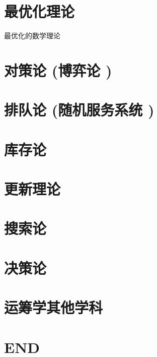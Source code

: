 \documentclass[UTF8]{../09-Mathematics}
\begin{document}
\chapter{最优化理论} %
最优化的数学理论

\chapter{对策论 (博弈论 )}
\chapter{排队论 (随机服务系统 )}

\chapter{库存论}
\chapter{更新理论}
\chapter{搜索论}



\chapter{决策论}
\chapter{运筹学其他学科}





\chapter{END}
\end{document}
